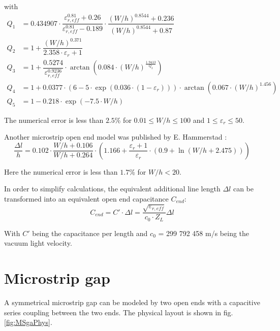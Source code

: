 \documentclass[10pt]{report}
\begin{document}
with
\begin{align}
Q_1 &= 0.434907\cdot \dfrac{\varepsilon_{r,eff}^{0.81}+0.26}{\varepsilon_{r,eff}^{0.81}-0.189}\cdot
      \dfrac{\left( W/h \right)^{0.8544} + 0.236}{\left( W/h \right)^{0.8544} + 0.87}\\
Q_2 &= 1 + \dfrac{\left( W/h \right) ^{0.371}}{2.358\cdot \varepsilon_r + 1}\\
Q_3 &= 1 + \dfrac{0.5274}{\varepsilon_{r,eff}^{0.9236}} \cdot
      \arctan\left( 0.084\cdot\left( W/h \right) ^{\tfrac{1.9413}{Q_2}} \right)\\
Q_4 &= 1 + 0.0377\cdot \left( 6-5\cdot\exp{\left(0.036\cdot\left(1-\varepsilon_r\right)\right)} \right)\cdot
      \arctan\left( 0.067\cdot\left(W/h\right)^{1.456} \right)\\
Q_5 &= 1 - 0.218\cdot \exp{\left( -7.5\cdot W/h \right)}
\end{align}

The numerical error is less than $2.5$\% for $0.01\le W/h \le 100$ and
$1\le\varepsilon_r\le 50$.

\addvspace{12pt}

Another microstrip open end model was published by E. Hammerstad
\cite{Hammerstad2}:
\begin{equation}
\dfrac{\Delta l}{h} = 0.102\cdot \dfrac{W/h+0.106}{W/h+0.264} \cdot
    \left( 1.166 + \dfrac{\varepsilon_r+1}{\varepsilon_r}\cdot \left(0.9+\ln{\left(W/h+2.475\right)} \right) \right)
\end{equation}

Here the numerical error is less than $1.7$\% for $W/h < 20$.

\addvspace{12pt}

In order to simplify calculations, the equivalent additional line
length $\Delta l$ can be transformed into an equivalent open end
capacitance $C_{end}$:
\begin{equation}
\label{eqn:Cend}
C_{end} = C'\cdot \Delta l = \dfrac{\sqrt{\varepsilon_{r,eff}}}{c_0\cdot Z_L} \Delta l
\end{equation}

With $C'$ being the capacitance per length and $c_0$ = 299 792 458 m/s
being the vacuum light velocity.

\section{Microstrip gap}

A symmetrical microstrip gap can be modeled by two open ends with a
capacitive series coupling between the two ends.  The physical layout
is shown in fig. \ref{fig:MSgaPhys}.
\end{document}
